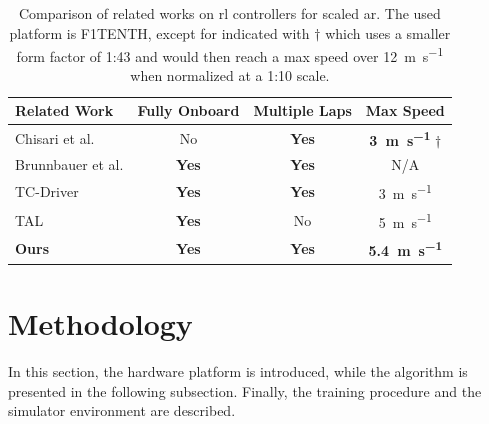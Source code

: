 \documentclass[letterpaper, conference]{IEEEtran}
\begin{document}
\begin{table}[bt]
    \centering
    \vspace{0.15cm}
    \label{tab:rw}
    \begin{tabular}{lccc}
        \toprule
         Related Work & Fully Onboard & Multiple Laps & Max Speed \\
         \midrule
        Chisari et al. \cite{chisari2021learning}  & No & \textbf{Yes} & \textbf{\qty[text-series-to-math]{3}{\metre \per \second}} $\dagger$\\
        Brunnbauer et al. \cite{brunnbauer2022latent} & \textbf{Yes} & \textbf{Yes} & N/A \\
        TC-Driver \cite{Ghignone2023tcdriver} & \textbf{Yes} & \textbf{Yes} & \SI{3}{\metre \per \second} \\
        TAL \cite{EVANS2023comparing} & \textbf{Yes} & No & \SI{5}{\metre \per \second}\\
        \textbf{Ours} & \textbf{Yes} & \textbf{Yes} & \textbf{\qty[text-series-to-math]{5.4}{\metre \per \second}} \\
        \bottomrule
    \end{tabular}
        \caption{Comparison of related works on \gls{rl} controllers for scaled \gls{ar}. The used platform is F1TENTH, except for \cite{chisari2021learning} indicated with $\dagger$ which uses a smaller form factor of 1:43 and would then reach a max speed over \SI{12}{\metre \per \second} when normalized at a 1:10 scale. }
\end{table}


\section{Methodology} \label{sec:methodology}
In this section, the hardware platform is introduced, while the {\namealgo} algorithm is presented in the following subsection. Finally, the training procedure and the simulator environment are described.
\end{document}
